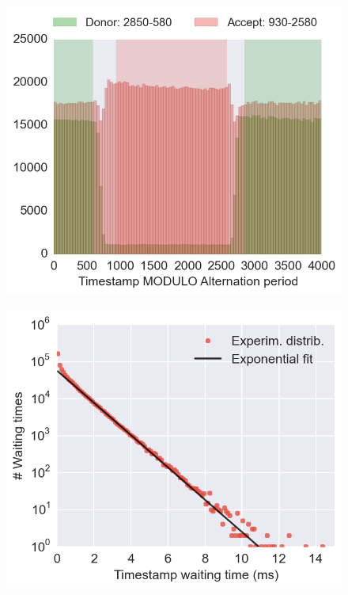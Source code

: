 

\author{Antonino Ingargiola}
\title{}


\verbatimfont{\small}

\maketitle

\begin{abstract}

\end{abstract}

\tableofcontents





\begin{figure}
\begin{center}
\includegraphics[width=0.6\columnwidth]{"figures/usALEX_alternation_hist/usALEX_alternation_hist"}
\caption[]{}
\end{center}
\end{figure}





\begin{figure}
\begin{center}
\includegraphics[width=0.6\columnwidth]{"figures/ph_delays_distrib1/ph_delays_distrib1"}
\caption[]{}
\end{center}
\end{figure}

